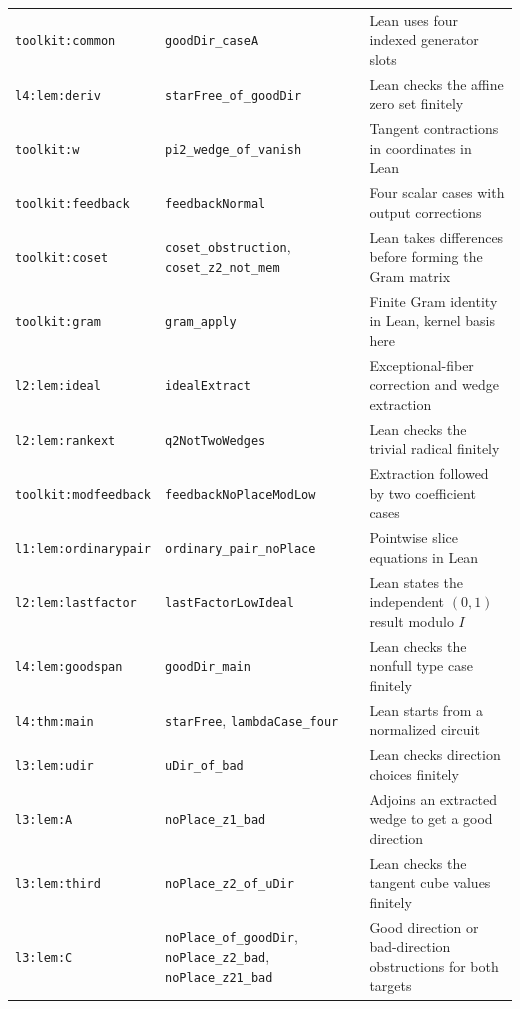 \documentclass[11pt,a4paper]{article}
\theoremstyle{plain}
\theoremstyle{remark}
\theoremstyle{plain}
\begin{document}
{\begin{longtable}{@{}>{\raggedright\arraybackslash}p{.21\linewidth}
>{\raggedright\arraybackslash}p{.42\linewidth}
>{\raggedright\arraybackslash}p{.31\linewidth}@{}}
\nolinkurl{toolkit:common} & \nolinkurl{goodDir_caseA} & Lean uses four indexed generator slots \\
\nolinkurl{l4:lem:deriv} & \nolinkurl{starFree_of_goodDir} & Lean checks the affine zero set finitely \\
\nolinkurl{toolkit:w} & \nolinkurl{pi2_wedge_of_vanish} & Tangent contractions in coordinates in Lean \\
\nolinkurl{toolkit:feedback} & \nolinkurl{feedbackNormal} & Four scalar cases with output corrections \\
\nolinkurl{toolkit:coset} & \nolinkurl{coset_obstruction}, \nolinkurl{coset_z2_not_mem} & Lean takes differences before forming the Gram matrix \\
\nolinkurl{toolkit:gram} & \nolinkurl{gram_apply} & Finite Gram identity in Lean, kernel basis here \\
\nolinkurl{l2:lem:ideal} & \nolinkurl{idealExtract} & Exceptional-fiber correction and wedge extraction \\
\nolinkurl{l2:lem:rankext} & \nolinkurl{q2NotTwoWedges} & Lean checks the trivial radical finitely \\
\nolinkurl{toolkit:modfeedback} & \nolinkurl{feedbackNoPlaceModLow} & Extraction followed by two coefficient cases \\
\nolinkurl{l1:lem:ordinarypair} & \nolinkurl{ordinary_pair_noPlace} & Pointwise slice equations in Lean \\
\nolinkurl{l2:lem:lastfactor} & \nolinkurl{lastFactorLowIdeal} & Lean states the independent $(0,1)$ result modulo $I$ \\
\nolinkurl{l4:lem:goodspan} & \nolinkurl{goodDir_main} & Lean checks the nonfull type case finitely \\
\nolinkurl{l4:thm:main} & \nolinkurl{starFree}, \nolinkurl{lambdaCase_four} & Lean starts from a normalized circuit \\
\nolinkurl{l3:lem:udir} & \nolinkurl{uDir_of_bad} & Lean checks direction choices finitely \\
\nolinkurl{l3:lem:A} & \nolinkurl{noPlace_z1_bad} & Adjoins an extracted wedge to get a good direction \\
\nolinkurl{l3:lem:third} & \nolinkurl{noPlace_z2_of_uDir} & Lean checks the tangent cube values finitely \\
\nolinkurl{l3:lem:C} & \nolinkurl{noPlace_of_goodDir}, \nolinkurl{noPlace_z2_bad}, \nolinkurl{noPlace_z21_bad} & Good direction or bad-direction obstructions for both targets \\

\end{longtable}}
\end{document}
